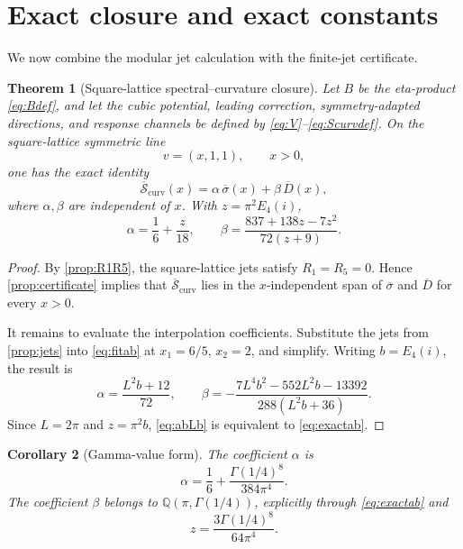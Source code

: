 \documentclass[11pt]{article}
\newtheorem{theorem}{Theorem}[section]
\newtheorem{corollary}[theorem]{Corollary}
\theoremstyle{definition}
\theoremstyle{remark}
\newcommand{\Q}{\mathbb{Q}}
\newcommand{\bsigma}{\overline{\sigma}}
\newcommand{\bD}{\overline{D}}
\newcommand{\bSc}{\overline{\mathcal{S}}_{\mathrm{curv}}}
\begin{document}
\section{Exact closure and exact constants}\label{sec:mainresult}

We now combine the modular jet calculation with the finite-jet certificate.

\begin{theorem}[Square-lattice spectral--curvature closure]\label{thm:main}
Let \(B\) be the eta-product \eqref{eq:Bdef}, and let the cubic potential, leading correction, symmetry-adapted directions, and response channels be defined by \eqref{eq:V}--\eqref{eq:Scurvdef}. On the square-lattice symmetric line
\[
 v=(x,1,1),
 \qquad x>0,
\]
one has the exact identity
\begin{equation}\label{eq:mainclosure}
 \bSc(x)=\alpha\,\bsigma(x)+\beta\,\bD(x),
\end{equation}
where \(\alpha,\beta\) are independent of \(x\). With \(z=\pi^2E_4(i)\),
\begin{equation}\label{eq:exactab}
 \boxed{
 \alpha=\frac16+\frac{z}{18},
 \qquad
 \beta=\frac{837+138z-7z^2}{72(z+9)}
 }.
\end{equation}
\end{theorem}

\begin{proof}
By \cref{prop:R1R5}, the square-lattice jets satisfy \(R_1=R_5=0\). Hence \cref{prop:certificate} implies that \(\bSc\) lies in the \(x\)-independent span of \(\bsigma\) and \(\bD\) for every \(x>0\).

It remains to evaluate the interpolation coefficients. Substitute the jets from \cref{prop:jets} into \eqref{eq:fitab} at \(x_1=6/5\), \(x_2=2\), and simplify. Writing \(b=E_4(i)\), the result is
\begin{equation}\label{eq:abLb}
 \alpha=\frac{L^2b+12}{72},
 \qquad
 \beta=-\frac{7L^4b^2-552L^2b-13392}{288(L^2b+36)}.
\end{equation}
Since \(L=2\pi\) and \(z=\pi^2b\), \eqref{eq:abLb} is equivalent to \eqref{eq:exactab}.
\end{proof}

\begin{corollary}[Gamma-value form]\label{cor:gamma}
The coefficient \(\alpha\) is
\[
 \alpha=\frac16+\frac{\Gamma(1/4)^8}{384\pi^4}.
\]
The coefficient \(\beta\) belongs to \(\Q(\pi,\Gamma(1/4))\), explicitly through \eqref{eq:exactab} and
\[
 z=\frac{3\Gamma(1/4)^8}{64\pi^4}.
\]
\end{corollary}
\end{document}

